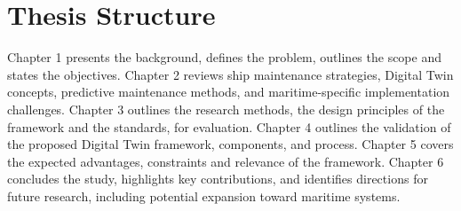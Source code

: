 \section{Thesis Structure}
\label{section:thesis-structure}

Chapter 1 presents the background, defines the problem, outlines the scope and states the objectives. Chapter 2 reviews ship maintenance strategies, Digital Twin concepts, predictive maintenance methods, and maritime-specific implementation challenges. Chapter 3 outlines the research methods, the design principles of the framework and the standards, for evaluation. Chapter 4 outlines the validation of the proposed Digital Twin framework, components, and process. Chapter 5 covers the expected advantages, constraints and relevance of the framework. Chapter 6 concludes the study, highlights key contributions, and identifies directions for future research, including potential expansion toward maritime systems.